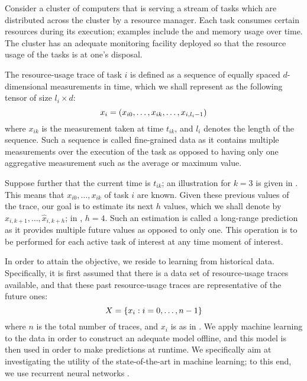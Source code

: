 Consider a cluster of computers that is serving a stream of tasks which are
distributed across the cluster by a resource manager. Each task consumes certain
resources during its execution; examples include the  and memory usage
over time. The cluster has an adequate monitoring facility deployed so that the
resource usage of the tasks is at one's disposal.

The resource-usage trace of task $i$ is defined as a sequence of equally spaced
$d$-dimensional measurements in time, which we shall represent as the following
tensor of size $l_i \times d$:
\begin{equation} \elab{trace}
  x_i = \left(x_{i0}, \dots, x_{ik}, \dots, x_{i,l_i - 1}\right)
\end{equation}
where $x_{ik}$ is the measurement taken at time $t_{ik}$, and $l_i$ denotes the
length of the sequence. Such a sequence is called fine-grained data as it
contains multiple measurements over the execution of the task as opposed to
having only one aggregative measurement such as the average or maximum value.

Suppose further that the current time is $t_{ik}$; an illustration for $k = 3$
is given in . This means that $x_{i0}, \dots, x_{ik}$ of task $i$
are known. Given these previous values of the trace, our goal is to estimate its
next $h$ values, which we shall denote by $\hat{x}_{i,k + 1}, \dots,
\hat{x}_{i,k + h}$; in , $h = 4$. Such an estimation is called a
long-range prediction as it provides multiple future values as opposed to only
one. This operation is to be performed for each active task of interest at any
time moment of interest.

In order to attain the objective, we reside to learning from historical data.
Specifically, it is first assumed that there is a data set of resource-usage
traces available, and that these past resource-usage traces are representative
of the future ones:
\begin{equation} \elab{traces}
  X = \{ x_i: i = 0, \dots, n - 1 \}
\end{equation}
where $n$ is the total number of traces, and $x_i$ is as in . We
apply machine learning to the data in order to construct an adequate model
offline, and this model is then used in order to make predictions at runtime. We
specifically aim at investigating the utility of the state-of-the-art in machine
learning; to this end, we use recurrent neural networks \cite{goodfellow2016}.

